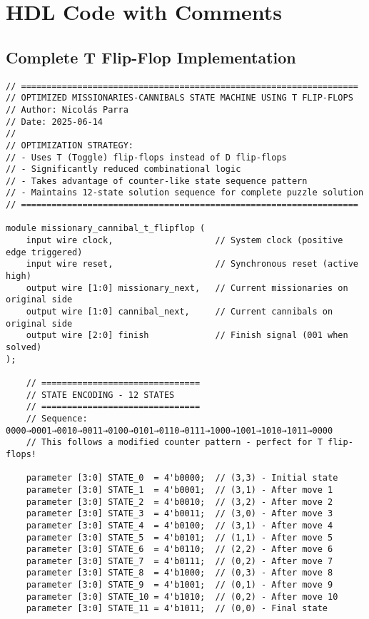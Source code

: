 \documentclass[12pt,letterpaper]{article}
\begin{document}
\newpage

\section{HDL Code with Comments}

\subsection{Complete T Flip-Flop Implementation}

\begin{lstlisting}[caption={Complete T Flip-Flop State Machine Implementation}]
// ==================================================================
// OPTIMIZED MISSIONARIES-CANNIBALS STATE MACHINE USING T FLIP-FLOPS
// Author: Nicolás Parra
// Date: 2025-06-14
// 
// OPTIMIZATION STRATEGY:
// - Uses T (Toggle) flip-flops instead of D flip-flops
// - Significantly reduced combinational logic
// - Takes advantage of counter-like state sequence pattern
// - Maintains 12-state solution sequence for complete puzzle solution
// ==================================================================

module missionary_cannibal_t_flipflop (
    input wire clock,                    // System clock (positive edge triggered)
    input wire reset,                    // Synchronous reset (active high)
    output wire [1:0] missionary_next,   // Current missionaries on original side
    output wire [1:0] cannibal_next,     // Current cannibals on original side  
    output wire [2:0] finish             // Finish signal (001 when solved)
);

    // ===============================
    // STATE ENCODING - 12 STATES
    // ===============================
    // Sequence: 0000→0001→0010→0011→0100→0101→0110→0111→1000→1001→1010→1011→0000
    // This follows a modified counter pattern - perfect for T flip-flops!
    
    parameter [3:0] STATE_0  = 4'b0000;  // (3,3) - Initial state
    parameter [3:0] STATE_1  = 4'b0001;  // (3,1) - After move 1
    parameter [3:0] STATE_2  = 4'b0010;  // (3,2) - After move 2
    parameter [3:0] STATE_3  = 4'b0011;  // (3,0) - After move 3
    parameter [3:0] STATE_4  = 4'b0100;  // (3,1) - After move 4
    parameter [3:0] STATE_5  = 4'b0101;  // (1,1) - After move 5
    parameter [3:0] STATE_6  = 4'b0110;  // (2,2) - After move 6
    parameter [3:0] STATE_7  = 4'b0111;  // (0,2) - After move 7
    parameter [3:0] STATE_8  = 4'b1000;  // (0,3) - After move 8
    parameter [3:0] STATE_9  = 4'b1001;  // (0,1) - After move 9
    parameter [3:0] STATE_10 = 4'b1010;  // (0,2) - After move 10
    parameter [3:0] STATE_11 = 4'b1011;  // (0,0) - Final state
    

\end{lstlisting}
\end{document}
